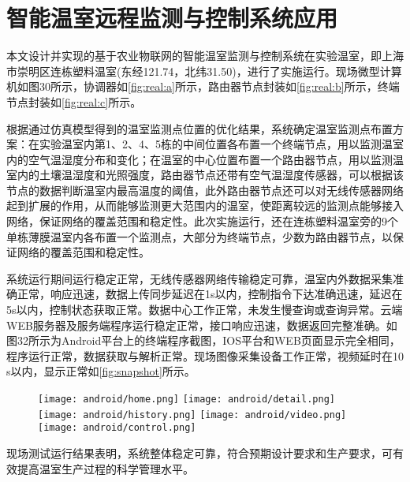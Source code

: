 \section{智能温室远程监测与控制系统应用}
本文设计并实现的基于农业物联网的智能温室监测与控制系统在实验温室，即上海市崇明区连栋塑料温室(东经121.74，北纬31.50)，进行了实施运行。现场微型计算机如图30所示，协调器如\ref{fig:real:a}所示，路由器节点封装如\ref{fig:real:b}所示，终端节点封装如\ref{fig:real:c}所示。
\begin{figure}[!htp]
	\centering
\end{figure}
根据通过仿真模型得到的温室监测点位置的优化结果，系统确定温室监测点布置方案：在实验温室内第1、2、4、5栋的中间位置各布置一个终端节点，用以监测温室内的空气温湿度分布和变化；在温室的中心位置布置一个路由器节点，用以监测温室内的土壤温湿度和光照强度，路由器节点还带有空气温湿度传感器，可以根据该节点的数据判断温室内最高温度的阈值，此外路由器节点还可以对无线传感器网络起到扩展的作用，从而能够监测更大范围内的温室，使距离较远的监测点能够接入网络，保证网络的覆盖范围和稳定性。此次实施运行，还在连栋塑料温室旁的9个单栋薄膜温室内各布置一个监测点，大部分为终端节点，少数为路由器节点，以保证网络的覆盖范围和稳定性。

系统运行期间运行稳定正常，无线传感器网络传输稳定可靠，温室内外数据采集准确正常，响应迅速，数据上传同步延迟在1s以内，控制指令下达准确迅速，延迟在5s以内，控制状态获取正常。数据中心工作正常，未发生慢查询或查询异常。云端WEB服务器及服务端程序运行稳定正常，接口响应迅速，数据返回完整准确。如图32所示为Android平台上的终端程序截图，IOS平台和WEB页面显示完全相同，程序运行正常，数据获取与解析正常。现场图像采集设备工作正常，视频延时在10 s以内，显示正常如\ref{fig:snapshot}所示。
	\begin{figure}[!htp]
		\centering
		\texttt{[image: android/home.png]}
		\texttt{[image: android/detail.png]}
		\texttt{[image: android/history.png]}
		\texttt{[image: android/video.png]}
		\texttt{[image: android/control.png]}	
	\end{figure}
现场测试运行结果表明，系统整体稳定可靠，符合预期设计要求和生产要求，可有效提高温室生产过程的科学管理水平。

